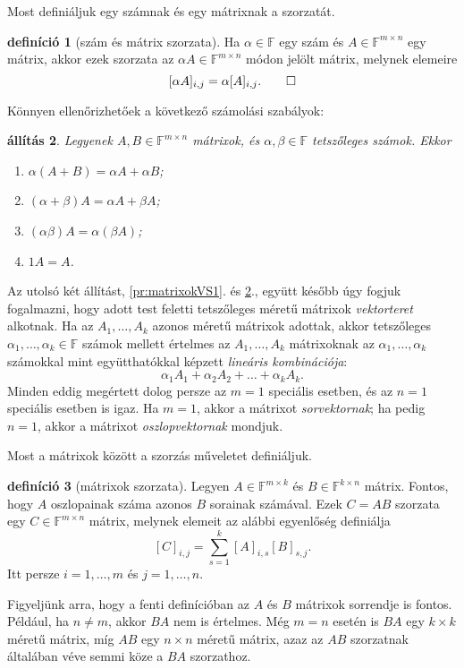 \documentclass[a4paper, showtrims]{memoir}
\theoremstyle{plain}
\newtheorem{proposition}{állítás}[chapter]
\theoremstyle{remark}
\theoremstyle{definition}
\newtheorem{definition}[proposition]{definíció}
\begin{document}
Most definiáljuk egy számnak és egy mátrixnak a szorzatát.
\begin{definition}[szám és mátrix szorzata]
	Ha $\alpha\in\mathbb{F}$ egy szám és $A\in\mathbb{F}^{m\times n}$ egy mátrix, akkor ezek szorzata
	az $\alpha A\in\mathbb{F}^{m\times n}$ módon jelölt mátrix, melynek elemeire
	\[
		[\alpha A]_{i,j}=\alpha[A]_{i,j}.\qedhere
	\]
\end{definition}
Könnyen ellenőrizhetőek a következő számolási szabályok:
\begin{proposition}\label{pr:matrixokVS2}
	Legyenek $A,B\in\mathbb{F}^{m\times n}$ mátrixok, és $\alpha,\beta\in\mathbb{F}$ tetszőleges számok.
	Ekkor
	\begin{enumerate}
		\item $\alpha\left( A+B \right)=\alpha A+\alpha B$;
		\item $\left( \alpha+\beta \right)A=\alpha A+\beta A$;
		\item $\left( \alpha\beta \right)A=\alpha\left( \beta A \right)$;
		\item $1 A=A$.\qedhere
	\end{enumerate}
\end{proposition}
Az utolsó két állítást, \ref{pr:matrixokVS1}. és \ref{pr:matrixokVS2}.,
együtt később úgy fogjuk fogalmazni,
hogy adott test feletti tetszőleges méretű mátrixok \emph{vektorteret} alkotnak.
Ha az $A_1,\ldots,A_k$ azonos méretű mátrixok adottak,
akkor tetszőleges $\alpha_1,\ldots,\alpha_k\in\mathbb{F}$
számok mellett értelmes az $A_1,\ldots,A_k$ mátrixoknak az $\alpha_1,\ldots,\alpha_k$ számokkal
mint együtthatókkal képzett \emph{lineáris kombinációja}:
\[
	\alpha_1A_1+\alpha_2A_2+\dots+\alpha_kA_k.
\]
Minden eddig megértett dolog persze az $m=1$ speciális esetben,
és az $n=1$ speciális esetben is igaz.
Ha $m=1$, akkor a mátrixot \emph{sorvektornak};
ha pedig $n=1$, akkor a mátrixot \emph{oszlopvektornak} mondjuk.

Most a mátrixok között a szorzás műveletet definiáljuk.
\begin{definition}[mátrixok szorzata]
	Legyen $A\in\mathbb{F}^{m\times k}$ és $B\in\mathbb{F}^{k\times n}$ mátrix.
	Fontos, hogy $A$ oszlopainak száma azonos $B$ sorainak számával.
	Ezek $C=AB$ szorzata egy $C\in\mathbb{F}^{m\times n}$ mátrix,
	melynek elemeit az alábbi egyenlőség definiálja
	\[
		[C]_{i,j}=\sum_{s=1}^k[A]_{i,s}[B]_{s,j}.
	\]
	Itt persze $i=1,\ldots,m$ és $j=1,\ldots,n.$
\end{definition}
Figyeljünk arra, hogy a fenti definícióban az $A$ és $B$ mátrixok sorrendje is fontos.
Például, ha $n\neq m$, akkor $BA$ nem is értelmes.
Még $m=n$ esetén is $BA$ egy $k\times k$ méretű mátrix, míg $AB$ egy $n\times n$ méretű mátrix,
azaz az $AB$ szorzatnak általában véve semmi köze a $BA$ szorzathoz.
\end{document}
